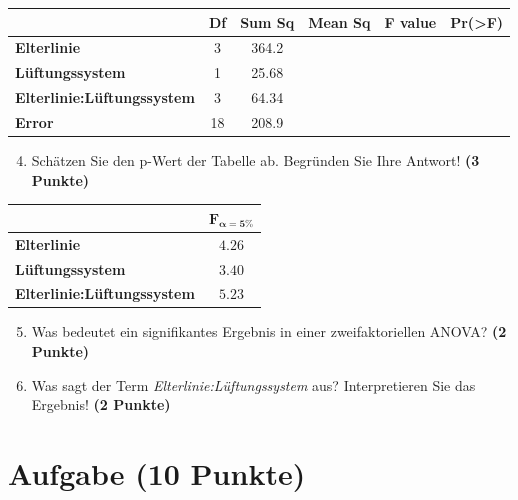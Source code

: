 \documentclass[a4paper, 9pt]{scrartcl}\usepackage[]{graphicx}\usepackage[]{xcolor}
\begin{document}
\begin{center}
  \Large
  \begin{tabular}{lccccc}
  \toprule
     & \textbf{Df} & \textbf{Sum Sq} & \textbf{Mean Sq} & \textbf{F value} & \textbf{Pr(>F)} \strut\\
    \midrule
   \textbf{Elterlinie}  & 3 & 364.2 &  &  &  \strut\\
    \textbf{Lüftungssystem}  & 1 & 25.68 &  &  &  \strut\\
    \textbf{Elterlinie:Lüftungssystem}  & 3 & 64.34 &  &  &  \strut\\
   \textbf{Error}  & 18 & 208.9 &  &  &  \strut\\
\bottomrule
  \end{tabular}
\end{center}

\vspace{1Ex}

\begin{enumerate}
  \setcounter{enumi}{3}
\item Schätzen Sie den p-Wert der Tabelle ab. Begründen Sie Ihre
  Antwort! \textbf{(3 Punkte)}
\end{enumerate}
  
\begin{center}
    \Large
\begin{tabular}{lc}
  \toprule
     & $\boldsymbol{F_{\alpha = 5\%}}$ \\
\midrule
  \textbf{Elterlinie} & $4.26$ \\
  \textbf{Lüftungssystem} & $3.40$ \\
  \textbf{Elterlinie:Lüftungssystem} & $5.23$ \\
  \bottomrule
  \end{tabular}
\end{center}

\begin{enumerate}
  \setcounter{enumi}{4}
\item Was bedeutet ein signifikantes Ergebnis in einer zweifaktoriellen ANOVA? \textbf{(2 Punkte)}
\item Was sagt der Term \textit{Elterlinie:Lüftungssystem} aus? Interpretieren Sie das Ergebnis! \textbf{(2 Punkte)}
\end{enumerate}
 
\clearpage

\section{Aufgabe \hfill (10 Punkte)}
\end{document}

